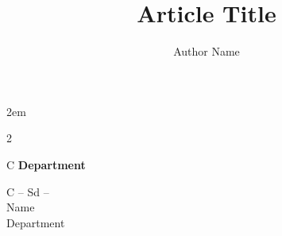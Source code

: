 \documentclass[12pt,a4paper,oneside]{article}
\title{Article Title}
\author{Author Name}
\date{\displaydate{date}}
\begin{document}
{\def\null\vskip 2em{}\maketitle}






%
%
%




\par\vspace{1em}
\begin{multicols}{2}
	\begin{table}[H]
		\begin{tabularx}{\columnwidth}{C}
			\textbf{Department}
		\end{tabularx}
	\end{table}
	\columnbreak
	\begin{table}[H]
		\begin{tabularx}{\columnwidth}{C}
			-- Sd -- \\
			Name     \\
			Department
		\end{tabularx}
	\end{table}
\end{multicols}


\end{document}
